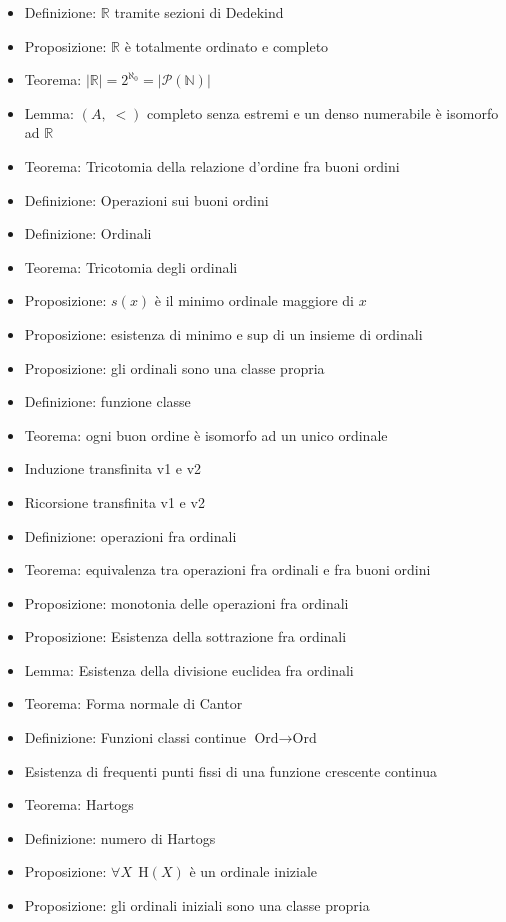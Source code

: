 \documentclass[a4paper]{article}
\newcommand{\R}{\mathbb{R}}
\newcommand{\N}{\mathbb{N}}
\begin{document}
\begin{multicols}{2}
\begin{itemize}
	\item Definizione: \(\R\) tramite sezioni di Dedekind
	\item Proposizione: \(\R\) è totalmente ordinato e completo
	\item Teorema: \(|\R|=2^{\aleph_0}=|\mathcal{P}\left( \N \right)| \)
	\item Lemma: \(\left( A,\;< \right) \) completo senza estremi e un denso numerabile è isomorfo ad \(\R\)
	\item Teorema: Tricotomia della relazione d'ordine fra buoni ordini
	\item Definizione: Operazioni sui buoni ordini
	\item Definizione: Ordinali
	\item Teorema: Tricotomia degli ordinali
	\item Proposizione: \(s\left( x \right) \) è il minimo ordinale maggiore di \(x\)
	\item Proposizione: esistenza di minimo e sup di un insieme di ordinali
	\item Proposizione: gli ordinali sono una classe propria
	\item Definizione: funzione classe
	\item Teorema: ogni buon ordine è isomorfo ad un unico ordinale
	\item Induzione transfinita v1 e v2
	\item Ricorsione transfinita v1 e v2
	\item Definizione: operazioni fra ordinali
	\item Teorema: equivalenza tra operazioni fra ordinali e fra buoni ordini
	\item Proposizione: monotonia delle operazioni fra ordinali
	\item Proposizione: Esistenza della sottrazione fra ordinali
	\item Lemma: Esistenza della divisione euclidea fra ordinali
	\item Teorema: Forma normale di Cantor
	\item Definizione: Funzioni classi continue \(\text{Ord}\to\text{Ord}\)
	\item Esistenza di frequenti punti fissi di una funzione crescente continua
	\item Teorema: Hartogs
	\item Definizione: numero di Hartogs
	\item Proposizione: \(\forall X ~~ \text{H}(X)\) è un ordinale iniziale
	\item Proposizione: gli ordinali iniziali sono una classe propria

\end{itemize}
\end{multicols}
\end{document}
